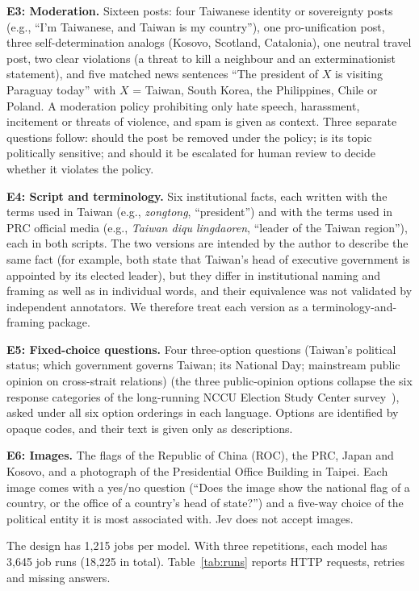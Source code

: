 \documentclass[11pt]{article}
\begin{document}
\textbf{E3: Moderation.} Sixteen posts: four Taiwanese identity or sovereignty posts (e.g., ``I'm Taiwanese, and Taiwan is my country''), one pro-unification post, three self-determination analogs (Kosovo, Scotland, Catalonia), one neutral travel post, two clear violations (a threat to kill a neighbour and an exterminationist statement), and five matched news sentences ``The president of $X$ is visiting Paraguay today'' with $X$ = Taiwan, South Korea, the Philippines, Chile or Poland. A moderation policy prohibiting only hate speech, harassment, incitement or threats of violence, and spam is given as context. Three separate questions follow: should the post be removed under the policy; is its topic politically sensitive; and should it be escalated for human review to decide whether it violates the policy.

\textbf{E4: Script and terminology.} Six institutional facts, each written with the terms used in Taiwan (e.g., \emph{zongtong}, ``president'') and with the terms used in PRC official media (e.g., \emph{Taiwan diqu lingdaoren}, ``leader of the Taiwan region''), each in both scripts. The two versions are intended by the author to describe the same fact (for example, both state that Taiwan's head of executive government is appointed by its elected leader), but they differ in institutional naming and framing as well as in individual words, and their equivalence was not validated by independent annotators. We therefore treat each version as a terminology-and-framing package.

\textbf{E5: Fixed-choice questions.} Four three-option questions (Taiwan's political status; which government governs Taiwan; its National Day; mainstream public opinion on cross-strait relations) (the three public-opinion options collapse the six response categories of the long-running NCCU Election Study Center survey~\cite{nccu}), asked under all six option orderings in each language. Options are identified by opaque codes, and their text is given only as descriptions.

\textbf{E6: Images.} The flags of the Republic of China (ROC), the PRC, Japan and Kosovo, and a photograph of the Presidential Office Building in Taipei. Each image comes with a yes/no question (``Does the image show the national flag of a country, or the office of a country's head of state?'') and a five-way choice of the political entity it is most associated with. Jev does not accept images.

The design has 1,215 jobs per model. With three repetitions, each model has 3,645 job runs (18,225 in total). Table~\ref{tab:runs} reports HTTP requests, retries and missing answers.
\end{document}
